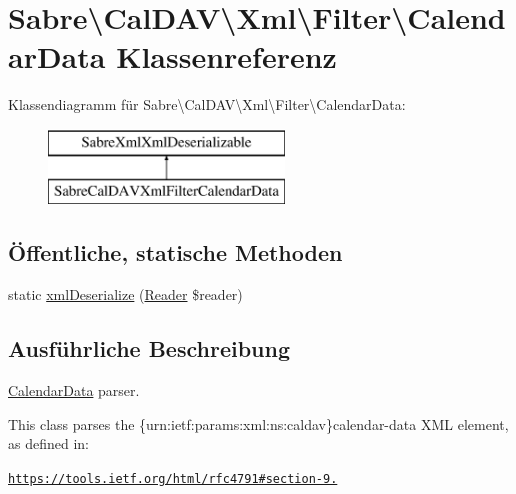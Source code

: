 \hypertarget{class_sabre_1_1_cal_d_a_v_1_1_xml_1_1_filter_1_1_calendar_data}{}\section{Sabre\textbackslash{}Cal\+D\+AV\textbackslash{}Xml\textbackslash{}Filter\textbackslash{}Calendar\+Data Klassenreferenz}
\label{class_sabre_1_1_cal_d_a_v_1_1_xml_1_1_filter_1_1_calendar_data}
Klassendiagramm für Sabre\textbackslash{}Cal\+D\+AV\textbackslash{}Xml\textbackslash{}Filter\textbackslash{}Calendar\+Data\+:\begin{figure}[H]
\begin{center}
\leavevmode
\includegraphics[height=2.000000cm]{class_sabre_1_1_cal_d_a_v_1_1_xml_1_1_filter_1_1_calendar_data}
\end{center}
\end{figure}
\subsection*{Öffentliche, statische Methoden}
\begin{DoxyCompactItemize}
\item 
static \mbox{\hyperlink{class_sabre_1_1_cal_d_a_v_1_1_xml_1_1_filter_1_1_calendar_data_acdcd5c6c8917760b3dd15bd10c4c7af3}{xml\+Deserialize}} (\mbox{\hyperlink{class_sabre_1_1_xml_1_1_reader}{Reader}} \$reader)
\end{DoxyCompactItemize}


\subsection{Ausführliche Beschreibung}
\mbox{\hyperlink{class_sabre_1_1_cal_d_a_v_1_1_xml_1_1_filter_1_1_calendar_data}{Calendar\+Data}} parser.

This class parses the \{urn\+:ietf\+:params\+:xml\+:ns\+:caldav\}calendar-\/data X\+ML element, as defined in\+:

\href{https://tools.ietf.org/html/rfc4791#section-9.6}{\tt https\+://tools.\+ietf.\+org/html/rfc4791\#section-\/9.}

